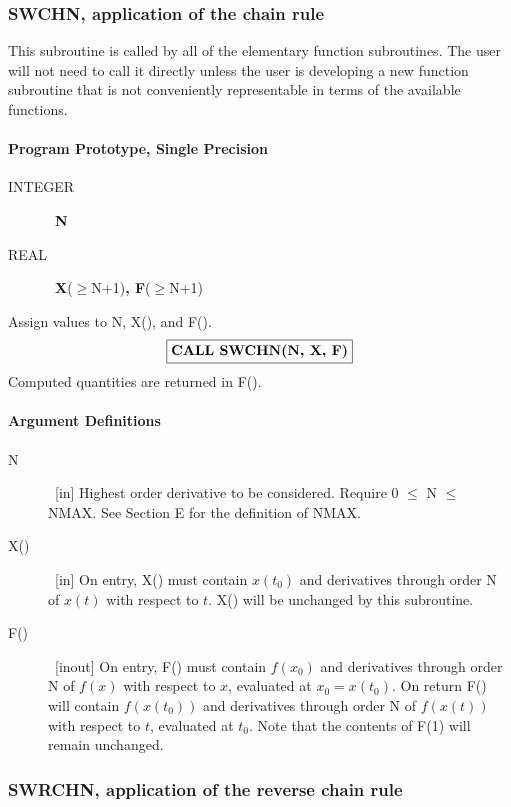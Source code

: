 \documentclass[twoside]{MATH77}
\begin{document}
\subsubsection{SWCHN, application of the chain rule\label{B3}}

This subroutine is called by all of the elementary function subroutines. The
user will not need to call it directly unless the user is developing a new
function subroutine that is not conveniently representable in terms of the
available functions.

\paragraph{Program Prototype, Single Precision}

\begin{description}
\item[INTEGER]  \ {\bf N}

\item[REAL]  \ {\bf X}($\geq $N+1){\bf , F}($\geq $N+1)
\end{description}

Assign values to N, X(), and F().
$$
\fbox{{\bf CALL SWCHN(N, X, F)}}
$$
Computed quantities are returned in F().

\paragraph{Argument Definitions}

\begin{description}
\item[N]  \ [in] Highest order derivative to be considered. Require 0 $\leq $
N $\leq $ NMAX. See Section E for the definition of NMAX.

\item[X()]  \ [in] On entry, X() must contain $x(t_0)$ and derivatives
through order N of $x(t)$ with respect to $t$. X() will be unchanged by this
subroutine.

\item[F()]  \ [inout] On entry, F() must contain $f(x_0)$ and derivatives
through order N of $f(x)$ with respect to $x$, evaluated at $x_0=x(t_0)$. On
return F() will contain $f(x(t_0))$ and derivatives through order N of $%
f(x(t))$ with respect to $t$, evaluated at $t_0$. Note that the contents of
F(1) will remain unchanged.
\end{description}

\subsubsection{SWRCHN, application of the reverse chain rule\label{B4}}
\end{document}
